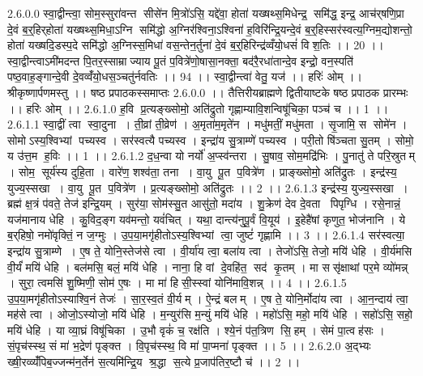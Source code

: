2.6.0.0
स्वा॒द्वीन्त्वा॒ सोम॒स्सुरा॑वन्त॒ सीसे॑न मि॒त्रो॑ऽसि॒ यद्दे॑वा॒ होता॑ यख्षथ्स॒मिधेन्द्र॒॒ समि॑द्ध॒ इन्द्र॒ आच॑र्‌षणि॒प्रा दे॒वं ब॒र्॒हिर्‌होता॑ यख्षथ्स॒मिधा॒ऽग्नि समि॑द्धो अ॒ग्निर॑श्विना॒ऽश्विना॑ ह॒विरि॑न्द्रि॒यन्दे॒वं ब॒र्॒हिस्सर॑स्वत्य॒ग्निम॒द्योशन्तो॒ होता॑ यख्षदि॒डस्प॒दे समि॑द्धो अ॒ग्निस्स॒मिधा॑ वस॒न्तेन॒र्तुना॑ दे॒वं ब॒र्॒हिरिन्द्र॑व्वँयो॒धसं॑ विश॒तिः ।। 20 ।। स्वा॒द्वीन्त्वाऽमी॑मदन्त पि॒तर॒स्साम्राज्याय पू॒तं प॒वित्रे॑णो॒षासा॒नक्ता॒ बद॑रै॒रधा॑तान्दे॒व इन्द्रो॒ वन॒स्पति॑ पष्ठ॒वाह॒ङ्गान्दे॒वी दे॒वव्वँ॑यो॒धस॒ञ्चतु॑र्नवतिः ।। 94 ।। स्वा॒द्वीन्त्वा॑ वेतु॒ यज॑ ।। हरिः॑ ओम् ।। श्रीकृष्णार्पणमस्तु ।। षष्ठ प्रपाठकस्समाप्तः
2.6.0.0
।। तैत्तिरीयब्राह्मणे द्वितीयाष्टके षष्ठ प्रपाठक प्रारम्भः ।। हरिः ओम् ।।
2.6.1.0
ह॒वि प्र॒त्यङ्ख्सोमो॒ अति॑द्रुतो गृह्णाम्यावि॒शन्विषू॑चिका॒ पञ्च॑ च ।। 1 ।।
2.6.1.1
स्वा॒द्वीं त्वा स्वा॒दुना । ती॒व्रां ती॒व्रेण॑ । अ॒मृता॑म॒मृते॑न । मधु॑मतीं॒ मधु॑मता । सृ॒जामि॒ स सोमे॑न । सोमोऽस्य॒श्विभ्यां पच्यस्व । सर॑स्वत्यै पच्यस्व । इन्द्रा॑य सु॒त्राम्णे॑ पच्यस्व । परी॒तो षि॑ञ्चता सु॒तम् । सोमो॒ य उ॑त्त॒म ह॒विः ।। 1 ।।
2.6.1.2
द॒ध॒न्वा यो नर्यो॑ अ॒प्स्व॑न्तरा । सु॒षाव॒ सोम॒मद्रि॑भिः । पु॒नातु॑ ते परि॒स्रुतम् । सोम॒॒ सूर्य॑स्य दुहि॒ता । वारे॑ण॒ शश्व॑ता॒ तना । वा॒यु पू॒त प॒वित्रे॑ण । प्राङ्ख्सोमो॒ अति॑द्रुतः । इन्द्र॑स्य॒ युज्य॒स्सखा । वा॒यु पू॒त प॒वित्रे॑ण । प्र॒त्यङ्ख्सोमो॒ अति॑द्रुतः ।। 2 ।।
2.6.1.3
इन्द्र॑स्य॒ युज्य॒स्सखा । ब्रह्म॑ क्ष॒त्रं प॑वते॒ तेज॑ इन्द्रि॒यम् । सुर॑या॒ सोम॑स्सु॒त आसु॑तो॒ मदा॑य । शु॒क्रेण॑ देव दे॒वता पिपृग्धि । रसे॒नान्नं॒ यज॑मानाय धेहि । कु॒विद॒ङ्ग यव॑मन्तो॒ यवं॑चित् । यथा॒ दान्त्य॑नुपू॒र्वं वि॒यूय॑ । इ॒हेहै॑षां कृणुत॒ भोज॑नानि । ये ब॒र्‌हिषो॒ नमो॑वृक्तिं॒ न ज॒ग्मुः । उ॒प॒या॒मगृ॑हीतोऽस्य॒श्विभ्यां त्वा॒ जुष्टं॑ गृह्णामि ।। 3 ।।
2.6.1.4
सर॑स्वत्या॒ इन्द्रा॑य सु॒त्राम्णे । ए॒ष ते॒ योनि॒स्तेज॑से त्वा । वी॒र्या॑य त्वा॒ बला॑य त्वा । तेजो॑ऽसि॒ तेजो॒ मयि॑ धेहि । वी॒र्य॑मसि वी॒र्यं॑ मयि॑ धेहि । बल॑मसि॒ बलं॒ मयि॑ धेहि । नाना॒ हि वां दे॒वहि॑त॒॒ सद॑ कृ॒तम् । मा ससृ॑क्षाथां पर॒मे व्यो॑मन्न् । सुरा॒ त्वमसि॑ शु॒ष्मिणी॒ सोम॑ ए॒षः । मा मा॑ हिसी॒स्स्वां योनि॑मावि॒शन्न् ।। 4 ।।
2.6.1.5
उ॒प॒या॒मगृ॑हीतोऽस्याश्वि॒नं तेजः॑ । सा॒र॒स्व॒तं वी॒र्यम् । ऐ॒न्द्रं बलम् । ए॒ष ते॒ योनि॒र्मोदा॑य त्वा । आ॒न॒न्दाय॑ त्वा॒ मह॑से त्वा । ओजो॒ऽस्योजो॒ मयि॑ धेहि । म॒न्युर॑सि म॒न्युं मयि॑ धेहि । महो॑ऽसि॒ महो॒ मयि॑ धेहि । सहो॑ऽसि॒ सहो॒ मयि॑ धेहि । या व्या॒घ्रं विषू॑चिका । उ॒भौ वृकं॑ च॒ रक्ष॑ति । श्ये॒नं प॑त॒त्रिण॑ सि॒॒हम् । सेमं पा॒त्वह॑सः । सं॒पृच॑स्स्थ॒ सं मा॑ भ॒द्रेण॑ पृङ्क्त । वि॒पृच॑स्स्थ॒ वि मा॑ पा॒प्मना॑ पृङ्क्त ।। 5 ।।
2.6.2.0
अ॒द्भ्यः ख्षी॒रव्व्यँ॑पिब॒ज्जन्म॑न॒र्तेन॑ स॒त्यमि॑न्द्रि॒य श्र॒द्धा स॒त्ये प्र॒जाप॑तिर॒ष्टौ च॑ ।। 2 ।।
